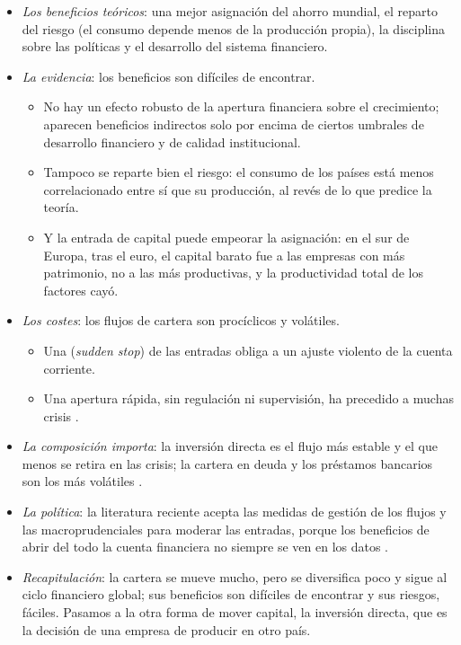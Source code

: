 \documentclass[11pt]{article}
\begin{document}
\begin{itemize}
\item \emph{Los beneficios teóricos}: una mejor asignación del ahorro mundial, el reparto del riesgo (el consumo depende menos de la producción propia), la disciplina sobre las políticas y el desarrollo del sistema financiero.
\item \emph{La evidencia}: los beneficios son difíciles de encontrar.
  \begin{itemize}
  \item No hay un efecto robusto de la apertura financiera sobre el crecimiento; aparecen beneficios indirectos solo por encima de ciertos umbrales de desarrollo financiero y de calidad institucional\nocite{KosePrasadRogoffWei2009}.
  \item Tampoco se reparte bien el riesgo: el consumo de los países está menos correlacionado entre sí que su producción, al revés de lo que predice la teoría\nocite{ObstfeldRogoff2000Six}.
  \item Y la entrada de capital puede empeorar la asignación: en el sur de Europa, tras el euro, el capital barato fue a las empresas con más patrimonio, no a las más productivas, y la productividad total de los factores cayó\nocite{GopinathEtAl2017Capital}.
  \end{itemize}
\item \emph{Los costes}: los flujos de cartera son procíclicos y volátiles.
  \begin{itemize}
  \item Una  (\emph{sudden stop}) de las entradas obliga a un ajuste violento de la cuenta corriente\nocite{Calvo1998SuddenStops}.
  \item Una apertura rápida, sin regulación ni supervisión, ha precedido a muchas crisis .
  \end{itemize}
\item \emph{La composición importa}: la inversión directa es el flujo más estable y el que menos se retira en las crisis; la cartera en deuda y los préstamos bancarios son los más volátiles\nocite{LevchenkoMauro2007} .
\item \emph{La política}: la literatura reciente acepta las medidas de gestión de los flujos y las macroprudenciales para moderar las entradas, porque los beneficios de abrir del todo la cuenta financiera no siempre se ven en los datos\nocite{Wei2018Managing} .
\item \emph{Recapitulación}: la cartera se mueve mucho, pero se diversifica poco y sigue al ciclo financiero global; sus beneficios son difíciles de encontrar y sus riesgos, fáciles. Pasamos a la otra forma de mover capital, la inversión directa, que es la decisión de una empresa de producir en otro país.
\end{itemize}
\end{document}
